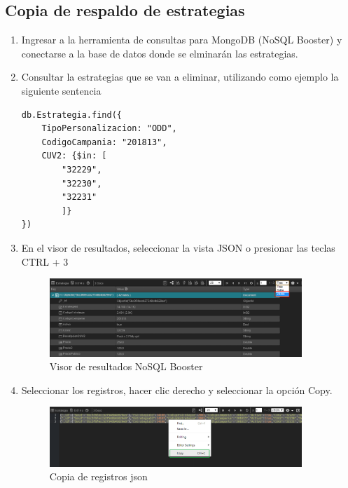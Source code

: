 \documentclass[a4paper,11pt]{paper}
\begin{document}
\subsection{Copia de respaldo de estrategias}
\begin{enumerate}
\def\labelenumi{\arabic{enumi}.}
\item
	Ingresar a la herramienta de consultas para MongoDB (NoSQL Booster) y conectarse a la base de datos donde se elminarán las estrategias.
\item
	Consultar la estrategias que se van a eliminar, utilizando como ejemplo la siguiente sentencia
\begin{lstlisting}
db.Estrategia.find({
    TipoPersonalizacion: "ODD",
    CodigoCampania: "201813",
    CUV2: {$in: [
        "32229",
        "32230",
        "32231"
        ]}
})
\end{lstlisting}

\item
	En el visor de resultados, seleccionar la vista JSON o presionar las teclas CTRL + 3
\begin{figure}[!h]
  \centering
  \includegraphics[width=0.9\textwidth]{imgs/ConsultaJson.png}
  \caption{Visor de resultados NoSQL Booster}
  \end{figure}

\item
	Seleccionar los registros, hacer clic derecho y seleccionar la opción Copy.
\begin{figure}[!h]
  \centering
  \includegraphics[width=0.9\textwidth]{imgs/CopiaResultado.png}
  \caption{Copia de registros json}
  \end{figure}


\end{enumerate}
\end{document}
